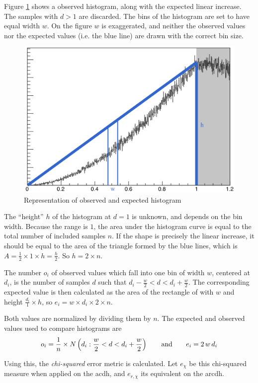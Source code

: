 Figure \ref{fig:hist_tri} shows a observed histogram, along with the expected linear increase. The samples with $d > 1$ are discarded. The bins of the histogram are set to have equal width $w$. On the figure $w$ is exaggerated, and neither the observed values nor the expected values (i.e. the blue line) are drawn with the correct bin size.

\begin{figure}[h]
\centering
\includegraphics[width=.5\textwidth]{fig/hist_tri.png}
\caption{Representation of observed and expected histogram}
\label{fig:hist_tri}
\end{figure}

The ``height'' $h$ of the histogram at $d = 1$ is unknown, and depends on the bin width. Because the range is $1$, the area under the histogram curve is equal to the total number of included samples $n$. If the shape is precisely the linear increase, it should be equal to the area of the triangle formed by the blue lines, which is $A = \frac{1}{2} \times 1 \times h = \frac{h}{2}$. So $h = 2 \times n$.

The number $o_i$ of observed values which fall into one bin of width $w$, centered at $d_i$, is the number of samples $d$ such that $d_i - \frac{w}{2} < d < d_i + \frac{w}{2}$. The corresponding expected value is then calculated as the area of the rectangle of with $w$ and height $\frac{d_i}{1} \times h$, so $e_i = w \times d_i \times 2 \times n$.

Both values are normalized by dividing them by $n$. The expected and observed values used to compare histograms are
\begin{equation}
o_i = \frac{1}{n} \times N\left(d_i : \frac{w}{2} < d < d_i + \frac{w}{2}\right)
\hspace{7mm} \text{and} \hspace{7mm}
e_i = 2 \, w \, d_i
\end{equation}

Using this, the \emph{chi-squared} error metric is calculated. Let $e_{\chi}$ be this chi-squared measure when applied on the \gls{acdh}, and $e_{r,\chi}$ its equivalent on the \gls{arcdh}.

